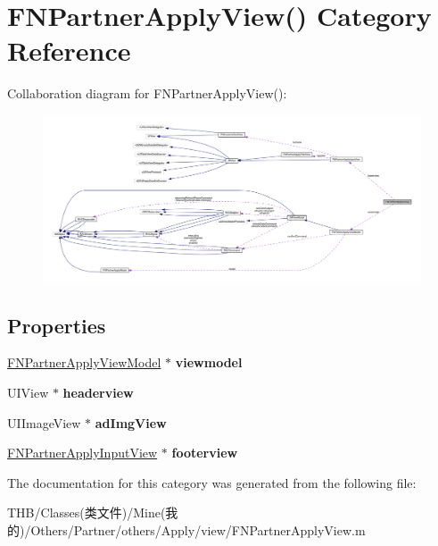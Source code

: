 \hypertarget{category_f_n_partner_apply_view_07_08}{}\section{F\+N\+Partner\+Apply\+View() Category Reference}
\label{category_f_n_partner_apply_view_07_08}


Collaboration diagram for F\+N\+Partner\+Apply\+View()\+:\nopagebreak
\begin{figure}[H]
\begin{center}
\leavevmode
\includegraphics[width=350pt]{category_f_n_partner_apply_view_07_08__coll__graph}
\end{center}
\end{figure}
\subsection*{Properties}
\begin{DoxyCompactItemize}
\item 
\mbox{\label{category_f_n_partner_apply_view_07_08_a10578daf5f91d56d630949618ae8c3d7}} 
\mbox{\hyperlink{interface_f_n_partner_apply_view_model}{F\+N\+Partner\+Apply\+View\+Model}} $\ast$ {\bfseries viewmodel}
\item 
\mbox{\label{category_f_n_partner_apply_view_07_08_aa3e54e3b72ea8db74bbb5efebd8364e0}} 
U\+I\+View $\ast$ {\bfseries headerview}
\item 
\mbox{\label{category_f_n_partner_apply_view_07_08_aa07c823051a62ebca3eafbc8c6ce382e}} 
U\+I\+Image\+View $\ast$ {\bfseries ad\+Img\+View}
\item 
\mbox{\label{category_f_n_partner_apply_view_07_08_a822add0a0fc22d9c3e70dbc206b6e5a7}} 
\mbox{\hyperlink{interface_f_n_partner_apply_input_view}{F\+N\+Partner\+Apply\+Input\+View}} $\ast$ {\bfseries footerview}
\end{DoxyCompactItemize}


The documentation for this category was generated from the following file\+:\begin{DoxyCompactItemize}
\item 
T\+H\+B/\+Classes(类文件)/\+Mine(我的)/\+Others/\+Partner/others/\+Apply/view/F\+N\+Partner\+Apply\+View.\+m\end{DoxyCompactItemize}
